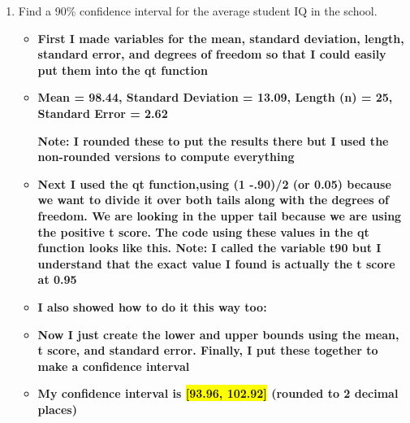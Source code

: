 \documentclass[12pt,letterpaper]{article}
\begin{document}
\begin{enumerate}
	\item Find a 90\% confidence interval for the average student IQ in the school.\\
	
\noindent
		\begin{itemize}
			\item \textbf{First I made variables for the mean, standard deviation, length, standard error, and degrees of freedom so that I could easily put them into the qt function}
			
			 
			
			
			\item \textbf{Mean = 98.44, Standard Deviation = 13.09, Length (n) = 25, Standard Error = 2.62}
			
			 \subitem \textbf {Note: I rounded these to put the results there but I used the non-rounded versions to compute everything}
			 
			\item \textbf{Next I used the qt function,using (1 -.90)/2 (or 0.05) because we want to divide it over both tails along with the degrees of freedom. We are looking in the upper tail because we are using the positive t score.  The code using these values in the qt function looks like this. Note: I called the variable t90 but I understand that the exact value I found is actually the t score at 0.95}
			
			
			
			\item \textbf{I also showed how to do it this way too:}
			
			
			
			\item \textbf{Now I just create the lower and upper bounds using the mean, t score, and standard error. Finally, I put these together to make a confidence interval}
			
			
			
			
			
			\item \textbf{My confidence interval is \colorbox{yellow}{[93.96, 102.92]} (rounded to 2 decimal places)}
			

\end{itemize}
\end{enumerate}
\end{document}
